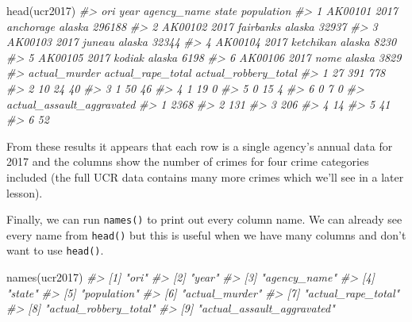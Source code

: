 \documentclass[
]{krantz}
\makeatletter
\newenvironment{Shaded}{\begin{snugshade}}{\end{snugshade}}
\newcommand{\CommentTok}[1]{\textcolor[rgb]{0.37,0.37,0.37}{\textit{#1}}}
\newcommand{\FunctionTok}[1]{\textcolor[rgb]{0,0,0}{#1}}
\newcommand{\NormalTok}[1]{#1}
\newenvironment{kframe}{%
\medskip{}
\setlength{\fboxsep}{.8em}
 \def\at@end@of@kframe{}%
 \ifinner\ifhmode%
  \def\at@end@of@kframe{\end{minipage}}%
  \begin{minipage}{\columnwidth}%
 \fi\fi%
 \def\FrameCommand##1{\hskip\@totalleftmargin \hskip-\fboxsep
 \colorbox{shadecolor}{##1}\hskip-\fboxsep
     \hskip-\linewidth \hskip-\@totalleftmargin \hskip\columnwidth}%
 \MakeFramed {\advance\hsize-\width
   \@totalleftmargin\z@ \linewidth\hsize
   \@setminipage}}%
 {\par\unskip\endMakeFramed%
 \at@end@of@kframe}
\renewenvironment{Shaded}{\begin{kframe}}{\end{kframe}}
\makeatother
\begin{document}
\begin{Shaded}
\begin{Highlighting}[]
\FunctionTok{head}\NormalTok{(ucr2017)}
\CommentTok{\#\textgreater{}       ori year agency\_name  state population}
\CommentTok{\#\textgreater{} 1 AK00101 2017   anchorage alaska     296188}
\CommentTok{\#\textgreater{} 2 AK00102 2017   fairbanks alaska      32937}
\CommentTok{\#\textgreater{} 3 AK00103 2017      juneau alaska      32344}
\CommentTok{\#\textgreater{} 4 AK00104 2017   ketchikan alaska       8230}
\CommentTok{\#\textgreater{} 5 AK00105 2017      kodiak alaska       6198}
\CommentTok{\#\textgreater{} 6 AK00106 2017        nome alaska       3829}
\CommentTok{\#\textgreater{}   actual\_murder actual\_rape\_total actual\_robbery\_total}
\CommentTok{\#\textgreater{} 1            27               391                  778}
\CommentTok{\#\textgreater{} 2            10                24                   40}
\CommentTok{\#\textgreater{} 3             1                50                   46}
\CommentTok{\#\textgreater{} 4             1                19                    0}
\CommentTok{\#\textgreater{} 5             0                15                    4}
\CommentTok{\#\textgreater{} 6             0                 7                    0}
\CommentTok{\#\textgreater{}   actual\_assault\_aggravated}
\CommentTok{\#\textgreater{} 1                      2368}
\CommentTok{\#\textgreater{} 2                       131}
\CommentTok{\#\textgreater{} 3                       206}
\CommentTok{\#\textgreater{} 4                        14}
\CommentTok{\#\textgreater{} 5                        41}
\CommentTok{\#\textgreater{} 6                        52}
\end{Highlighting}
\end{Shaded}

From these results it appears that each row is a single agency's annual data for 2017 and the columns show the number of crimes for four crime categories included (the full UCR data contains many more crimes which we'll see in a later lesson).

Finally, we can run \texttt{names()} to print out every column name. We can already see every name from \texttt{head()} but this is useful when we have many columns and don't want to use \texttt{head()}.

\begin{Shaded}
\begin{Highlighting}[]
\FunctionTok{names}\NormalTok{(ucr2017)}
\CommentTok{\#\textgreater{} [1] "ori"                      }
\CommentTok{\#\textgreater{} [2] "year"                     }
\CommentTok{\#\textgreater{} [3] "agency\_name"              }
\CommentTok{\#\textgreater{} [4] "state"                    }
\CommentTok{\#\textgreater{} [5] "population"               }
\CommentTok{\#\textgreater{} [6] "actual\_murder"            }
\CommentTok{\#\textgreater{} [7] "actual\_rape\_total"        }
\CommentTok{\#\textgreater{} [8] "actual\_robbery\_total"     }
\CommentTok{\#\textgreater{} [9] "actual\_assault\_aggravated"}
\end{Highlighting}
\end{Shaded}
\end{document}

